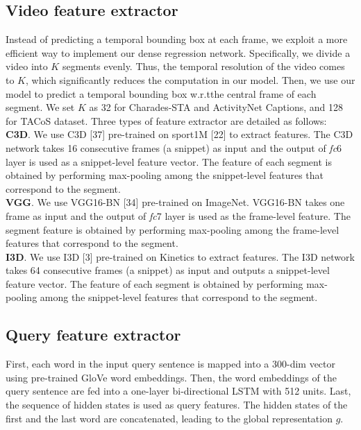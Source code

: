 \documentclass[10pt,twocolumn,letterpaper]{article}
\def\wrt{w.r.t\onedot} \def\dof{d.o.f\onedot}
\begin{document}
\subsection{Video feature extractor}

Instead of predicting a temporal bounding box at each frame, we exploit a more efficient way to implement our dense regression network. Specifically, we divide a video into $K$ segments evenly. Thus, the temporal resolution of the video comes to $K$, which significantly reduces the computation in our model. 
Then, we use our model to predict a temporal bounding box \wrt the central frame of each segment.
We set $K$ as 32 for Charades-STA and ActivityNet Captions, and 128 for TACoS dataset. Three types of feature extractor are detailed as follows: \\
\noindent \textbf{C3D}. We use C3D [37] pre-trained on sport1M [22] to extract features. The C3D network takes 16 consecutive frames (a snippet) as input and the output of \textit{fc}6 layer is used as a snippet-level feature vector. The feature of each segment is obtained by performing max-pooling among the snippet-level features that correspond to the segment.\\
\noindent \textbf{VGG}.
We use VGG16-BN [34] pre-trained on ImageNet. VGG16-BN takes one frame as input and the output of \textit{fc}7 layer is used as the frame-level feature.
The segment feature is obtained by performing max-pooling among the frame-level features that correspond to the segment.\\
\noindent \textbf{I3D}.
We use I3D [3] pre-trained on Kinetics to extract features. The I3D network takes 64 consecutive frames (a snippet) as input and outputs a snippet-level feature vector. The feature of each segment is obtained by performing max-pooling among the snippet-level features that correspond to the segment.





\subsection{Query feature extractor}

First, each word in the input query sentence is mapped into a 300-dim vector using pre-trained GloVe word embeddings. Then, the word embeddings of the query sentence are fed into a one-layer bi-directional LSTM with 512 units. Last, the sequence of hidden states is used as query features. The hidden states of the first and the last word are concatenated, leading to the global representation $g$.
\end{document}
